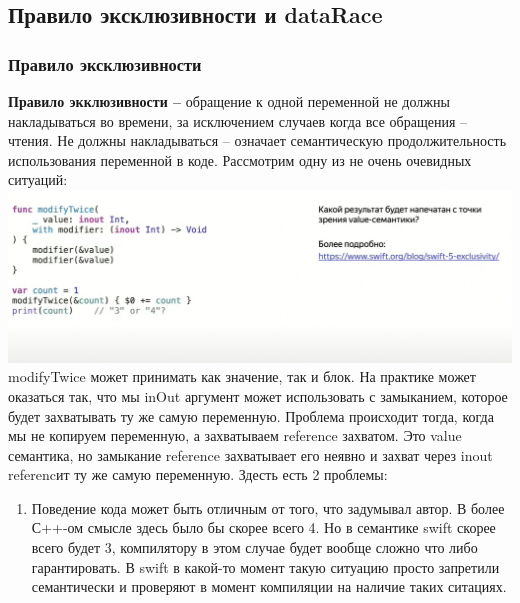 \documentclass{article}
\begin{document}
    \subsection{Правило эксклюзивности и dataRace}
    \subsubsection{Правило эксклюзивности}
    \textbf{Правило экклюзивности --} обращение к одной переменной не должны накладываться во времени, за исключением случаев когда все обращения -- чтения.  Не должны накладываться -- означает семантическую продолжительность использования переменной в коде. 
    \newline
    Рассмотрим одну из не очень очевидных ситуаций: 
    \newline
    \includegraphics[scale = 0.5]{pic/Снимок экрана 2023-08-04 в 11.57.08.png}
    \newline
    modifyTwice может принимать как значение, так и блок. На практике может оказаться так, что мы inOut аргумент может использовать с замыканием, которое будет захватывать ту же самую переменную. Проблема происходит тогда, когда мы не копируем переменную, а захватываем reference захватом. Это value семантика, но замыкание reference захватывает его неявно и захват через inout referencит ту же самую переменную. Здесть есть 2 проблемы: 
    \begin{enumerate}
        \item Поведение кода может быть отличным от того, что задумывал автор. В более С++-ом смысле здесь было бы скорее всего 4. Но в семантике swift скорее всего будет 3, компилятору в этом случае будет вообще сложно что либо гарантировать. В swift в какой-то момент такую ситуацию просто запретили семантически и проверяют в момент компиляции на наличие таких ситациях.
    \end{enumerate}
\end{document}
